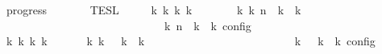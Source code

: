 \begin{isabellebody}
\begin{isamarkuptext}
\end{isamarkuptext}\isamarkuptrue%
\isamarkupfalse%
\ progress{\isacharcolon}\isanewline
\ \ \ {\isacartoucheopen}{\isasymrho}\ {\isasymin}\ {\isasymlbrakk}{\isasymlbrakk}\ {\isasymPsi}\ {\isasymrbrakk}{\isasymrbrakk}\isactrlsub T\isactrlsub E\isactrlsub S\isactrlsub L{\isacartoucheclose}\isanewline
\ \ \ \ \ {\isacartoucheopen}{\isasymexists}k\ {\isasymGamma}\isactrlsub k\ {\isasymPsi}\isactrlsub k\ {\isasymPhi}\isactrlsub k{\isachardot}\ {\isacharparenleft}{\isacharparenleft}{\isacharbrackleft}{\isacharbrackright}{\isacharcomma}\ {}\ {\isasymturnstile}\ {\isasymPsi}\ {\isasymtriangleright}\ {\isacharbrackleft}{\isacharbrackright}{\isacharparenright}\ \ {\isasymhookrightarrow}\isactrlbsup k\isactrlesup \ {\isacharparenleft}{\isasymGamma}\isactrlsub k{\isacharcomma}\ n\ {\isasymturnstile}\ {\isasymPsi}\isactrlsub k\ {\isasymtriangleright}\ {\isasymPhi}\isactrlsub k{\isacharparenright}{\isacharparenright}\isanewline
\ \ \ \ \ \ \ \ \ \ \ \ \ \ \ \ \ \ \ \ \ \ \ \ \ {\isasymand}\ {\isasymrho}\ {\isasymin}\ {\isasymlbrakk}\ {\isasymGamma}\isactrlsub k{\isacharcomma}\ n\ {\isasymturnstile}\ {\isasymPsi}\isactrlsub k\ {\isasymtriangleright}\ {\isasymPhi}\isactrlsub k\ {\isasymrbrakk}\isactrlsub c\isactrlsub o\isactrlsub n\isactrlsub f\isactrlsub i\isactrlsub g{\isacartoucheclose}\isanewline
%
\isadelimproof
%
\endisadelimproof
%
\isatagproof
{}\isamarkupfalse%
\ {\isacharminus}\isanewline
\ \ \isamarkupfalse%
\ {}{\isacharcolon}{\isacartoucheopen}{\isasymexists}{\isasymGamma}\isactrlsub k\ {\isasymPsi}\isactrlsub k\ {\isasymPhi}\isactrlsub k\ k{\isachardot}\ {\isacharparenleft}{\isacharparenleft}{\isacharbrackleft}{\isacharbrackright}{\isacharcomma}\ {}\ {\isasymturnstile}\ {\isasymPsi}\ {\isasymtriangleright}\ {\isacharbrackleft}{\isacharbrackright}{\isacharparenright}\ {\isasymhookrightarrow}\isactrlbsup k\isactrlesup \ {\isacharparenleft}{\isasymGamma}\isactrlsub k{\isacharcomma}\ {}\ {\isasymturnstile}\ {\isasymPsi}\isactrlsub k\ {\isasymtriangleright}\ {\isasymPhi}\isactrlsub k{\isacharparenright}{\isacharparenright}\isanewline
\ \ \ \ \ \ \ \ \ \ \ \ \ \ \ \ \ \ \ \ \ \ {\isasymand}\ {\isasymrho}\ {\isasymin}\ {\isasymlbrakk}\ {\isasymGamma}\isactrlsub k{\isacharcomma}\ {}\ {\isasymturnstile}\ {\isasymPsi}\isactrlsub k\ {\isasymtriangleright}\ {\isasymPhi}\isactrlsub k\ {\isasymrbrakk}\isactrlsub c\isactrlsub o\isactrlsub n\isactrlsub f\isactrlsub i\isactrlsub g{\isacartoucheclose}\isanewline

\end{isabellebody}
